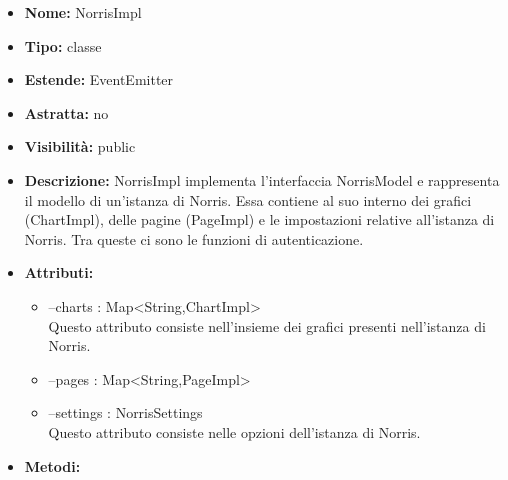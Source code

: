 			
			\begin{itemize}
			\item \textbf{Nome:} NorrisImpl
			\item \textbf{Tipo:} classe
			
		\item \textbf{Estende:}
		EventEmitter
		\item \textbf{Astratta:}
		no
			\item \textbf{Visibilità:} public
			\item \textbf{Descrizione:} NorrisImpl implementa l'interfaccia NorrisModel e rappresenta il modello di un'istanza di Norris. Essa contiene al suo interno dei grafici (ChartImpl), delle pagine (PageImpl) e le impostazioni relative all'istanza di Norris. Tra queste ci sono le funzioni di autenticazione.
			\item \textbf{Attributi:}
				\begin{itemize}
				\setlength{\itemsep}{5pt}
				
					\item[\ding{111}] {--charts : Map<String,ChartImpl>} \\ [1mm] Questo attributo consiste nell'insieme dei grafici presenti nell'istanza di Norris.
					\item[\ding{111}] {--pages : Map<String,PageImpl>}
					\item[\ding{111}] {--settings : NorrisSettings} \\ [1mm] Questo attributo consiste nelle opzioni dell'istanza di Norris.
				\end{itemize}
		
			\item \textbf{Metodi:}
				\begin{itemize}
				\setlength{\itemsep}{5pt}
				

\end{itemize}
\end{itemize}
